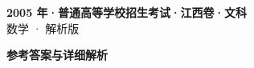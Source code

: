 \documentclass[zihao=-4, a4paper]{ctexart}
\begin{document}
\begin{center}
  {\Large\bfseries 2005 年·普通高等学校招生考试·江西卷·文科}\\[4pt]
  {\large 数学 · 解析版}
\end{center}
\medskip
{}

\clearpage
{}
\begin{center}{\Large\bfseries 参考答案与详细解析}\end{center}
\medskip

\end{document}
